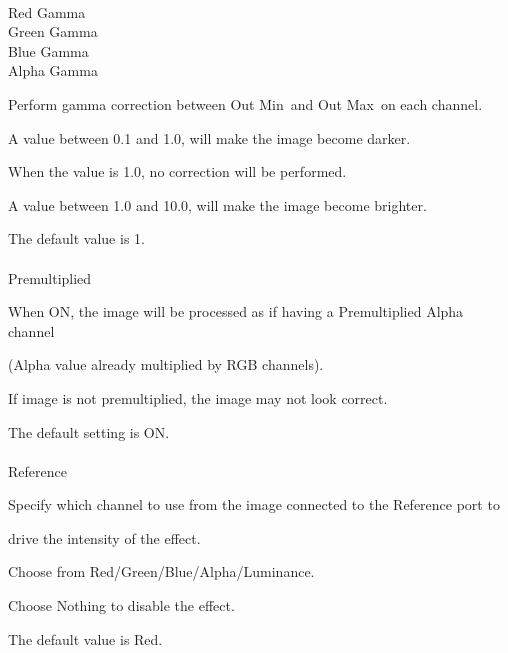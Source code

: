 \documentclass[a4paper,12pt]{article}
\begin{document}
\newpage

\thispagestyle{empty}

\ \vspace{-0.2em}
\\
Red Gamma\\
Green Gamma\\
Blue Gamma\\
Alpha Gamma\par
Perform gamma correction between \textquotedbl Out Min\textquotedbl \ and \textquotedbl Out Max\textquotedbl \ on each channel.\par
A value between 0.1 and 1.0, will make the image become darker.\par
When the value is 1.0, no correction will be performed.\par
A value between 1.0 and 10.0, will make the image become brighter.\par
The default value is 1.\\
\\
Premultiplied\par
When ON, the image will be processed as if having a Premultiplied Alpha channel\par 
(Alpha value already multiplied by RGB channels).\par
If image is not premultiplied, the image may not look correct.\par
The default setting is ON.\\
\\
Reference\par
Specify which channel to use from the image connected to the Reference port to\par 
drive the intensity of the effect.\par
Choose from Red/Green/Blue/Alpha/Luminance.\par
Choose Nothing to disable the effect.\par
The default value is \textquotedbl Red\textquotedbl .
\end{document}
